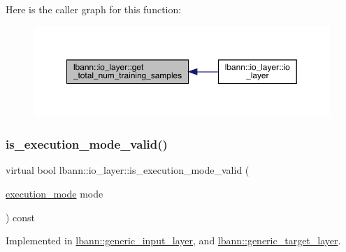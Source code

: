 Here is the caller graph for this function\+:\nopagebreak
\begin{figure}[H]
\begin{center}
\leavevmode
\includegraphics[width=350pt]{classlbann_1_1io__layer_a744fe02208657194120714387b49cb28_icgraph}
\end{center}
\end{figure}
\mbox{\label{classlbann_1_1io__layer_a37e2f77a99ee44106ac7d9fd3a275dcc}} 
\subsubsection{\texorpdfstring{is\+\_\+execution\+\_\+mode\+\_\+valid()}{is\_execution\_mode\_valid()}}
{\footnotesize\ttfamily virtual bool lbann\+::io\+\_\+layer\+::is\+\_\+execution\+\_\+mode\+\_\+valid (\begin{DoxyParamCaption}\item[{\hyperlink{base_8hpp_a2781a159088df64ed7d47cc91c4dc0a8}{execution\+\_\+mode}}]{mode }\end{DoxyParamCaption}) const\hspace{0.3cm}{\ttfamily [pure virtual]}}



Implemented in \hyperlink{classlbann_1_1generic__input__layer_a31082076a8aad937eef3cadc0b5e1b27}{lbann\+::generic\+\_\+input\+\_\+layer}, and \hyperlink{classlbann_1_1generic__target__layer_a0ae18b3b410c3b6c1a5b34a3547ba4c5}{lbann\+::generic\+\_\+target\+\_\+layer}.

